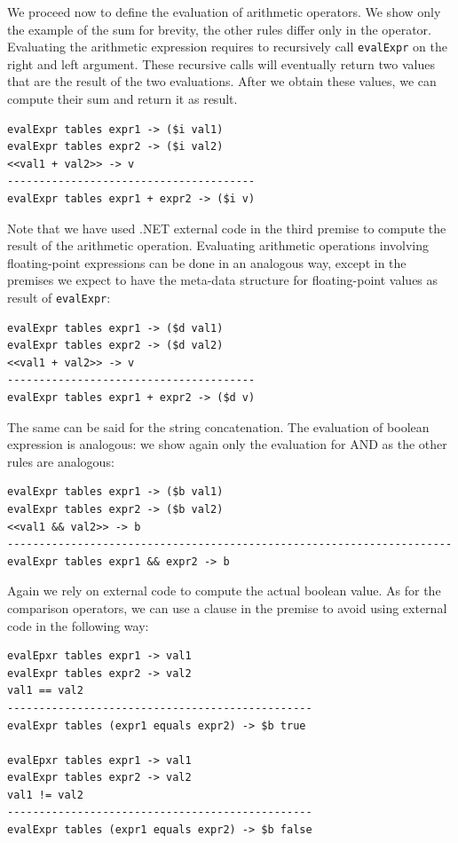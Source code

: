 We proceed now to define the evaluation of arithmetic operators. We show only the example of the sum for brevity, the other rules differ only in the operator. Evaluating the arithmetic expression requires to recursively call \texttt{evalExpr} on the right and left argument. These recursive calls will eventually return two values that are the result of the two evaluations. After we obtain these values, we can compute their sum and return it as result.

\begin{lstlisting}
evalExpr tables expr1 -> ($i val1)
evalExpr tables expr2 -> ($i val2)
<<val1 + val2>> -> v
---------------------------------------
evalExpr tables expr1 + expr2 -> ($i v)
\end{lstlisting}

\noindent
Note that we have used .NET external code in the third premise to compute the result of the arithmetic operation. Evaluating arithmetic operations involving floating-point expressions can be done in an analogous way, except in the premises we expect to have the meta-data structure for floating-point values as result of \texttt{evalExpr}:

\begin{lstlisting}
evalExpr tables expr1 -> ($d val1)
evalExpr tables expr2 -> ($d val2)
<<val1 + val2>> -> v
---------------------------------------
evalExpr tables expr1 + expr2 -> ($d v)
\end{lstlisting}

\noindent
The same can be said for the string concatenation.
The evaluation of boolean expression is analogous: we show again only the evaluation for AND as the other rules are analogous:

\begin{lstlisting}
evalExpr tables expr1 -> ($b val1)
evalExpr tables expr2 -> ($b val2)
<<val1 && val2>> -> b
----------------------------------------------------------------------
evalExpr tables expr1 && expr2 -> b
\end{lstlisting}

\noindent
Again we rely on external code to compute the actual boolean value.
As for the comparison operators, we can use a clause in the premise to avoid using external code in the following way:

\begin{lstlisting}
evalEpxr tables expr1 -> val1
evalExpr tables expr2 -> val2
val1 == val2
------------------------------------------------
evalExpr tables (expr1 equals expr2) -> $b true

evalEpxr tables expr1 -> val1
evalExpr tables expr2 -> val2
val1 != val2
------------------------------------------------
evalExpr tables (expr1 equals expr2) -> $b false
\end{lstlisting}

